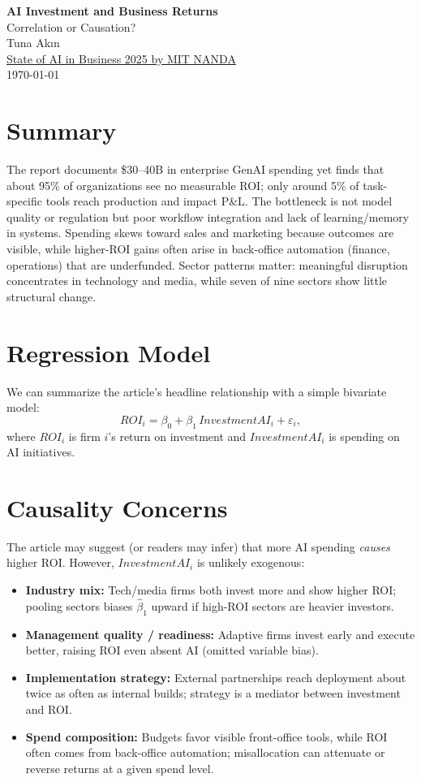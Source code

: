 \documentclass[11pt]{article}
\begin{document}
\doublespacing
\vspace*{-2cm} 
\begin{center}
    {\LARGE \textbf{AI Investment and Business Returns}}\\[0.5em]
    {\large Correlation or Causation?}\\[1em]
    Tuna Akın\\
    \href{https://mlq.ai/media/quarterly_decks/v0.1_State_of_AI_in_Business_2025_Report.pdf}{State of AI in Business 2025 by MIT NANDA}\\
    \today
\end{center}

\section*{Summary}
The report documents \$30--40B in enterprise GenAI spending yet finds that about 95\% of organizations see no measurable ROI; only around 5\% of task-specific tools reach production and impact P\&L. The bottleneck is not model quality or regulation but poor workflow integration and lack of learning/memory in systems. Spending skews toward sales and marketing because outcomes are visible, while higher-ROI gains often arise in back-office automation (finance, operations) that are underfunded. Sector patterns matter: meaningful disruption concentrates in technology and media, while seven of nine sectors show little structural change.

\section*{Regression Model}
We can summarize the article’s headline relationship with a simple bivariate model:
\[
ROI_i = \beta_0 + \beta_1 \, InvestmentAI_i + \varepsilon_i,
\]
where $ROI_i$ is firm $i$’s return on investment and $InvestmentAI_i$ is spending on AI initiatives.

\section*{Causality Concerns}
The article may suggest (or readers may infer) that more AI spending \emph{causes} higher ROI. However, $InvestmentAI_i$ is unlikely exogenous:

\begin{itemize}
    \item \textbf{Industry mix:} Tech/media firms both invest more and show higher ROI; pooling sectors biases $\hat{\beta}_1$ upward if high-ROI sectors are heavier investors.
    \item \textbf{Management quality / readiness:} Adaptive firms invest early and execute better, raising ROI even absent AI (omitted variable bias).
    \item \textbf{Implementation strategy:} External partnerships reach deployment about twice as often as internal builds; strategy is a mediator between investment and ROI.
    \item \textbf{Spend composition:} Budgets favor visible front-office tools, while ROI often comes from back-office automation; misallocation can attenuate or reverse returns at a given spend level.
\end{itemize}
\end{document}
